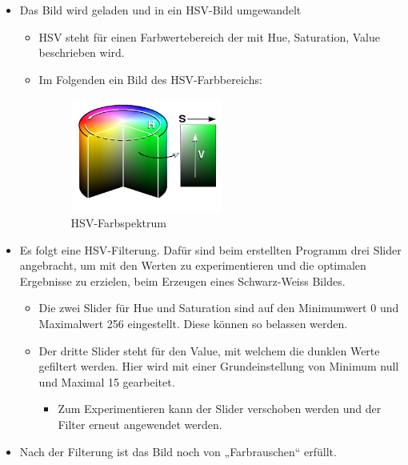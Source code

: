 \begin{itemize}
    \item Das Bild wird geladen und in ein HSV-Bild umgewandelt
    \begin{itemize}
        \item HSV steht für einen Farbwertebereich der mit Hue, Saturation, 
            Value beschrieben wird.
        \item Im Folgenden ein Bild des HSV-Farbbereichs:\\
        \begin{figure}[h!]
            \centering
            \includegraphics[width=0.5\textwidth]{fig/HSV_cylinder.jpg}
            \caption[HSV-Farbspektrum]{HSV-Farbspektrum \cite{wiki:gimp2_farbmodelle}}
            \label{fig:HSV-Farbspektrum}
        \end{figure}
    \end{itemize}
    \item Es folgt eine HSV-Filterung. Dafür sind beim erstellten Programm drei 
        Slider angebracht, um mit den Werten zu experimentieren und die 
        optimalen Ergebnisse zu erzielen, beim Erzeugen eines Schwarz-Weiss Bildes.
    \begin{itemize}
        \item Die zwei Slider für Hue und Saturation sind auf den Minimumwert 0 
            und Maximalwert 256 eingestellt. Diese können so belassen werden.
        \item Der dritte Slider steht für den Value, mit welchem die dunklen Werte 
            gefiltert werden. Hier wird mit einer Grundeinstellung von Minimum 
            null und Maximal 15 gearbeitet.
        \begin{itemize}
            \item Zum Experimentieren kann der Slider verschoben werden und 
                der Filter erneut angewendet werden.
        \end{itemize}
    \end{itemize}
    \item Nach der Filterung ist das Bild noch von „Farbrauschen“ erfüllt. 

\end{itemize}
